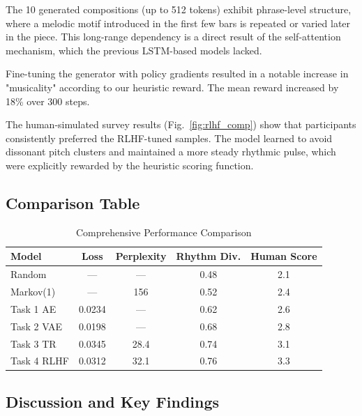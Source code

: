 \documentclass[conference]{IEEEtran}
\begin{document}
The 10 generated compositions (up to 512 tokens) exhibit phrase-level structure, where a melodic motif introduced in the first few bars is repeated or varied later in the piece. This long-range dependency is a direct result of the self-attention mechanism, which the previous LSTM-based models lacked.

Fine-tuning the generator with policy gradients resulted in a notable increase in "musicality" according to our heuristic reward. The mean reward increased by 18\% over 300 steps.


The human-simulated survey results (Fig.~\ref{fig:rlhf_comp}) show that participants consistently preferred the RLHF-tuned samples. The model learned to avoid dissonant pitch clusters and maintained a more steady rhythmic pulse, which were explicitly rewarded by the heuristic scoring function.

\subsection{Comparison Table}

\begin{table}[h]
\centering
\begin{tabular}{lcccc}
\toprule
Model & Loss & Perplexity & Rhythm Div. & Human Score \\
\midrule
Random & — & — & 0.48 & 2.1 \\
Markov(1) & — & 156 & 0.52 & 2.4 \\
Task 1 AE & 0.0234 & — & 0.62 & 2.6 \\
Task 2 VAE & 0.0198 & — & 0.68 & 2.8 \\
Task 3 TR & 0.0345 & 28.4 & 0.74 & 3.1 \\
Task 4 RLHF & 0.0312 & 32.1 & 0.76 & 3.3 \\
\bottomrule
\end{tabular}
\caption{Comprehensive Performance Comparison}
\end{table}

\subsection{Discussion and Key Findings}
\label{subsec:discussion}
\end{document}
